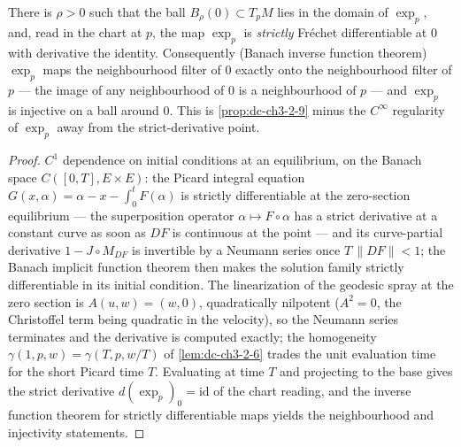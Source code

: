 \begin{lemma}
  \label{lem:dc-ch3-2-9-strict}
  \leanok
  There is $\rho > 0$ such that the ball $B_\rho(0) \subset T_pM$ lies in the
  domain of $\exp_p$, and, read in the chart at $p$, the map $\exp_p$ is
  \emph{strictly} Fréchet differentiable at $0$ with derivative the identity.
  Consequently (Banach inverse function theorem) $\exp_p$ maps the
  neighbourhood filter of $0$ exactly onto the neighbourhood filter of $p$ —
  the image of any neighbourhood of $0$ is a neighbourhood of $p$ — and
  $\exp_p$ is injective on a ball around $0$. This is
  \cref{prop:dc-ch3-2-9} minus the $C^\infty$ regularity of $\exp_p$ away from
  the strict-derivative point.
\end{lemma}
\begin{proof}
  \sketch
  \leanok
  $C^1$ dependence on initial conditions at an equilibrium, on the Banach
  space $C([0,T], E \times E)$: the Picard integral equation
  $G(x, \alpha) = \alpha - x - \int_0^t F(\alpha)$ is strictly differentiable
  at the zero-section equilibrium — the superposition operator
  $\alpha \mapsto F \circ \alpha$ has a strict derivative at a constant curve
  as soon as $DF$ is continuous at the point — and its curve-partial
  derivative $1 - J \circ M_{DF}$ is invertible by a Neumann series once
  $T\,\|DF\| < 1$; the Banach implicit function theorem then makes the
  solution family strictly differentiable in its initial condition. The
  linearization of the geodesic spray at the zero section is
  $A(u, w) = (w, 0)$, quadratically nilpotent ($A^2 = 0$, the Christoffel term
  being quadratic in the velocity), so the Neumann series terminates and the
  derivative is computed exactly; the homogeneity
  $\gamma(1, p, w) = \gamma(T, p, w/T)$ of \cref{lem:dc-ch3-2-6} trades the
  unit evaluation time for the short Picard time $T$. Evaluating at time $T$
  and projecting to the base gives the strict derivative
  $d(\exp_p)_0 = \mathrm{id}$ of the chart reading, and the inverse function
  theorem for strictly differentiable maps yields the neighbourhood and
  injectivity statements.
\end{proof}

